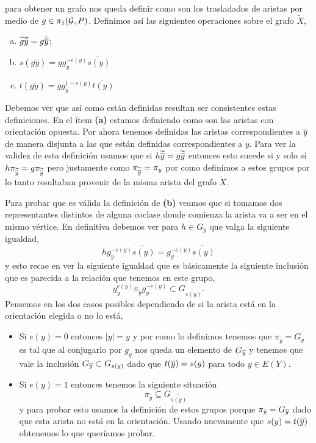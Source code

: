 \documentclass[tesis.tex]{subfiles}
\newcommand{\cG}{ {\cal G} }
\begin{document}
para obtener un grafo nos queda definir como son los trasladados de aristas por medio de $g \in \pi_1(\cG, P)$.
Definimos así las siguientes operaciones sobre el grafo $\tilde X$,
\begin{enumerate}[(a)]
	\item $\overline{g \tilde y} = g \tilde{\overline y}$;
	\item $s(g \tilde y) = g g_y^{-e(y)} \widetilde{s(y)}$
	\item $t(g \tilde y) = g g_y^{1-e(y)} \widetilde{t(y)}$
\end{enumerate}

Debemos ver que así como están definidas resultan ser consistentes estas definiciones.
En el ítem \textbf{(a)} estamos definiendo como son las aristas con orientación opuesta. 
Por ahora tenemos definidas las aristas correspondientes a $\overline y$ de manera disjunta a las que están definidas correspondientes a $y$.
Para ver la validez de esta definición usamos que si $h\widetilde{\overline y} = g\widetilde{\overline y}$ entonces esto sucede si y solo sí $h\pi_{\widetilde{\overline y}} =g\pi_{\widetilde{\overline y}} $ pero justamente como $\pi_{\widetilde{\overline y}} = \pi_{y} $ por como definimos a estos grupos por lo tanto resultaban provenir de la misma arista del grafo $\tilde X$.

Para probar que es válida la definición de \textbf{(b)} veamos que si tomamos dos representantes distintos de alguna coclase donde comienza la arista va a ser en el mismo vértice.
En definitiva debemos ver para $h \in G_y$ que valga la siguiente igualdad,
\[
	hg_y^{-e(y)} \widetilde{s(y)} = g_y^{-e(y)} \widetilde{s(y)}
\] 
y esto recae en ver la siguiente igualdad que es básicamente la siguiente inclusión que es parecida a la relación que tenemos en este grupo,
\[
	g_y^{e(y)}\pi_{\tilde y}g_y^{-e(y)} \subset G_{\widetilde{s(y)}}.
\]
Pensemos en los dos casos posibles dependiendo de si la arista está en la orientación elegida o no lo está,
\begin{itemize}
	\item Si $e(y) = 0$ entonces $|y| = y$ y por como lo definimos tenemos que $\pi_{\tilde y} = G_{y}$ es tal que al conjugarlo por $g_y$ nos queda un elemento de $G_{\overline y}$ y tenemos que vale la inclusión $G_{\overline y} \subset G_{s(y)}$ dado que $t(\overline y) = s(y)$ para todo $y \in E(Y)$.
	\item Si $e(y) = 1$ entonces tenemos la siguiente situación
	\[
		\pi_{\tilde y} \subseteq G_{\widetilde{s(y)}}	
	\] 
	y para probar esto usamos la definición de estos grupos porque $\pi_{\tilde y} = G_{\overline y}$ dado que esta arista no está en la orientación.
	Usando nuevamente que $s(y) = t(\overline y)$ obtenemos lo que queríamos probar.  
\end{itemize}
\end{document}
